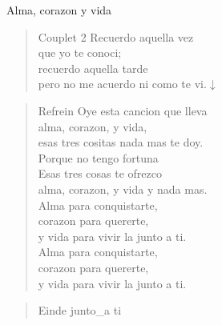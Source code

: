 \begin{song}[vals]{Alma, corazon y vida}
\begin{verse}{Couplet 2}
	\hspace{0.6cm}Recuerdo aquella vez\\
	\hspace{0.6cm}que yo te conoci;\\ 
	\hspace*{0.6cm}recuerdo aquella tarde\\      
	\hspace*{0.6cm}pero no me acuerdo ni como te vi.\hspace{0.5cm}$\downarrow$
\end{verse}
\begin{verse}{Refrein}
Oye esta cancion que lleva\\
alma, corazon, y vida,\\
esas tres cositas nada mas te doy.\\
Porque no tengo fortuna\\
Esas tres cosas te ofrezco\\
alma, corazon, y vida y nada mas.\\
Alma para conquistarte,\\ 
corazon para quererte,\\ 
y vida para vivir la junto a ti.\hspace{0.6cm}    \\
Alma para conquistarte,\\
corazon para quererte,\\
y vida para vivir la junto a ti.\\
\end{verse}

\begin{verse}{Einde}
junto\_a ti\hspace{1.5em}  \hspace{1.5em} \\
\end{verse}



\end{song}
